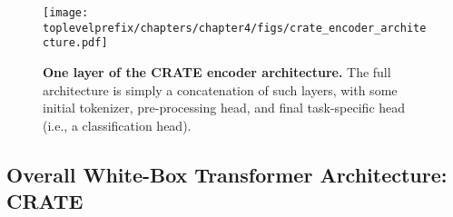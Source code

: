 \documentclass[../../book-main.tex]{subfiles}
\begin{document}

\begin{figure}
     \centering
     \texttt{[image: \\toplevelprefix/chapters/chapter4/figs/crate\_encoder\_architecture.pdf]}
    \caption{\small \textbf{One layer of the CRATE encoder architecture.} The full architecture is simply a concatenation of such layers, with some initial tokenizer, pre-processing head, and final task-specific head (i.e., a classification head).}
    \label{fig:crate_backbone}
\end{figure}



\subsection{Overall White-Box Transformer Architecture: CRATE}
\end{document}
